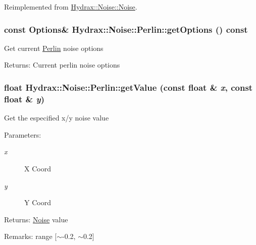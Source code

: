 Reimplemented from \hyperlink{class_hydrax_1_1_noise_1_1_noise_59f0e03e88a5de69065838adc35ff2d8}{Hydrax::Noise::Noise}.\hypertarget{class_hydrax_1_1_noise_1_1_perlin_9264b637fe60ec9edf77c5e64881a62f}{
\subsubsection[{getOptions}]{\setlength{\rightskip}{0pt plus 5cm}const {\bf Options}\& Hydrax::Noise::Perlin::getOptions () const}}
\label{class_hydrax_1_1_noise_1_1_perlin_9264b637fe60ec9edf77c5e64881a62f}


Get current \hyperlink{class_hydrax_1_1_noise_1_1_perlin}{Perlin} noise options \begin{Desc}
\item[Returns:]Current perlin noise options \end{Desc}
\hypertarget{class_hydrax_1_1_noise_1_1_perlin_64bbe19643e0a87c08c62d0e73d7aac6}{
\subsubsection[{getValue}]{\setlength{\rightskip}{0pt plus 5cm}float Hydrax::Noise::Perlin::getValue (const float \& {\em x}, \/  const float \& {\em y})}}
\label{class_hydrax_1_1_noise_1_1_perlin_64bbe19643e0a87c08c62d0e73d7aac6}


Get the especified x/y noise value \begin{Desc}
\item[Parameters:]
\begin{description}
\item[{\em x}]X Coord \item[{\em y}]Y Coord \end{description}
\end{Desc}
\begin{Desc}
\item[Returns:]\hyperlink{class_hydrax_1_1_noise_1_1_noise}{Noise} value \end{Desc}
\begin{Desc}
\item[Remarks:]range \mbox{[}$\sim$-0.2, $\sim$0.2\mbox{]} \end{Desc}



